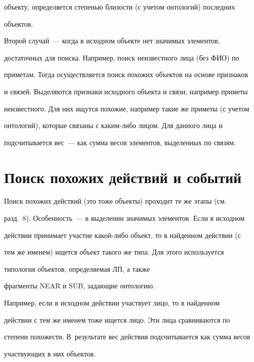 объекту, определяется степенью близости (с учетом онтологий) последних 


объектов. 


    


    Второй случай~--- когда в исходном объекте нет значимых элементов, 


достаточных для поиска. Например, поиск неизвестного лица (без ФИО) по 


приметам. Тогда осуществляется поиск похожих объектов на основе признаков 


и связей. Выделяются признаки исходного объекта и связи, например приметы 


неизвестного. Для них ищутся похожие, например такие же приметы (с учетом 


онтологий), которые связаны с каким-либо лицом. Для данного лица и 


подсчитывается вес~--- как сумма весов элементов, выделенных по связям.


    


\section{Поиск похожих действий и событий} 


    


    Поиск похожих действий (это тоже объекты) проходит те же этапы (см.\ 


разд.~8). Особенность~--- в выделении значимых элементов. Если в исходном 


действии принимает участие какой-либо объект, то в найденном действии (с 


тем же именем) ищется объект такого же типа. Для этого используется 


типология объектов, определяемая ЛП, а также 


фрагменты NEAR и SUB, задающие онтологию.


    


    Например, если в исходном действии участвует лицо, то в найденном 


действии с тем же именем тоже ищется лицо. Эти лица сравниваются по 


степени похожести. В~результате вес действия подсчитывается как сумма весов 


участвующих в них объектов. 


